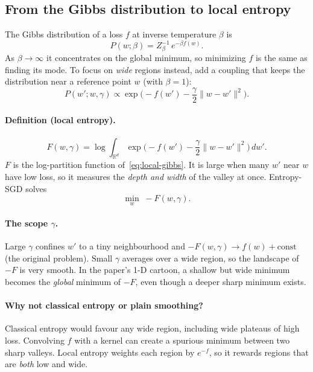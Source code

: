 \documentclass[11pt]{article}
\newcommand{\R}{\mathbb{R}}
\theoremstyle{plain}
\begin{document}
\subsection{From the Gibbs distribution to local entropy}

The Gibbs distribution of a loss $f$ at inverse temperature $\beta$ is
\begin{equation}
  P(w;\beta) = Z_\beta^{-1}\, e^{-\beta f(w)} .
\end{equation}
As $\beta\to\infty$ it concentrates on the global minimum, so minimizing $f$ is the same as finding its mode. To focus on
\emph{wide} regions instead, add a coupling that keeps the distribution near a reference point $w$ (with $\beta=1$):
\begin{equation}
  P(w'; w, \gamma) \propto \exp\!\Big(-f(w') - \frac{\gamma}{2}\|w - w'\|^2\Big).
  \label{eq:local-gibbs}
\end{equation}

\paragraph{Definition (local entropy).}
\begin{equation}
  F(w,\gamma) = \log \int_{\R^d} \exp\!\Big(-f(w') - \frac{\gamma}{2}\|w - w'\|^2\Big)\, dw' .
  \label{eq:local-entropy}
\end{equation}
$F$ is the log-partition function of~\eqref{eq:local-gibbs}. It is large when many $w'$ near $w$ have low loss, so it measures
the \emph{depth and width} of the valley at once. Entropy-SGD solves
\begin{equation}
  \min_w\; -F(w,\gamma).
\end{equation}

\paragraph{The scope $\gamma$.} Large $\gamma$ confines $w'$ to a tiny neighbourhood and $-F(w,\gamma) \to f(w) + \text{const}$
(the original problem). Small $\gamma$ averages over a wide region, so the landscape of $-F$ is very smooth. In the paper's 1-D
cartoon, a shallow but wide minimum becomes the \emph{global} minimum of $-F$, even though a deeper sharp minimum exists.

\paragraph{Why not classical entropy or plain smoothing?} Classical entropy would favour any wide region, including wide plateaus
of high loss. Convolving $f$ with a kernel can create a spurious minimum between two sharp valleys. Local entropy weights each
region by $e^{-f}$, so it rewards regions that are \emph{both} low and wide.
\end{document}
